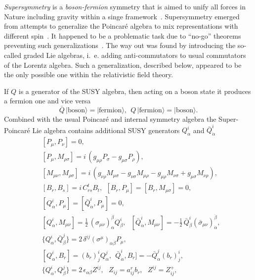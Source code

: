 \documentclass{cernyrep}
\begin{document}
 {\it Supersymmetry} is a {\it boson-fermion} symmetry that is
aimed to unify all forces in Nature including gravity within a
singe framework~\cite{super,Rev,WessB,sspace,Books}.
Supersymmetry emerged from attempts to generalize the Poincar\'e
algebra to mix representations with different spin~\cite{super}.
It happened to be a problematic task due to ``no-go'' theorems
preventing such generalizations~\cite{theorem}. The way out was
found by introducing the so-called graded Lie algebras, i.~e. adding
anti-commutators to usual commutators of the Lorentz algebra.
Such a generalization, described below, appeared to be the only
possible one within the relativistic field theory.

If $Q$ is a generator of the SUSY algebra, then acting on a
boson state it produces a fermion one and vice versa
$$
\bar Q \, | \text{boson} \rangle = | \text{fermion} \rangle , \ \
Q \, | \text{fermion} \rangle = | \text{boson} \rangle.
$$
Combined with the usual Poincar\'e and internal symmetry
algebra the Super-Poincar\'e Lie algebra contains additional
SUSY generators
$Q_{\alpha}^i$ and $\bar Q_{\dot\alpha}^i$~\cite{WessB}
\begin{equation}
\begin{split}
&[P_\mu, P_\nu] = 0, \\
&[P_\mu, M_{\rho\sigma}] = i \,(g_{\mu\rho} P_\sigma - g_{\mu\sigma} P_\rho), \\
&[M_{\mu\nu}, M_{\rho\sigma}] =
    i \,(g_{\nu\rho} M_{\mu\sigma} - g_{\nu\sigma} M_{\mu\rho}
    - g_{\mu\rho} M_{\nu \sigma} + g_{\mu\sigma} M_{\nu\rho}), \\
     &[B_r, B_s] = i \, C_{rs}^t B_{t}, \ \ 
[B_r , P_{\mu}] = [B_r, M_{\mu\sigma}] = 0, \\
&[Q_{\alpha}^i , P_{\mu}] = [\bar Q_{\dot\alpha}^i, P_{\mu}] = 0, \\
&[Q_{\alpha}^i , M_{\mu\nu}] = \frac12 \, (\sigma_{\mu\nu})_{\alpha}^{\beta}Q_{\beta}^i, \ \ \
 [\bar Q_{\dot\alpha}^i, M_{\mu\nu}] = -\frac12 \, \bar Q_{\dot\beta}^i
   (\bar\sigma_{\mu\nu})_{\dot\alpha}^{\dot \beta}, \\
   &\{ Q_{\alpha}^i, \bar Q_{\dot\beta}^j \} = 2 \, \delta^{ij} (\sigma^\mu)_{\alpha \dot\beta} P_\mu, \\
    &[Q_{\alpha}^i, B_r] = (b_r)_j^i Q_{\alpha}^j, \ \  \bar Q_{\dot\alpha}^i, B_r] = - \bar Q_{\dot\alpha}^j (b_r)_j^i, \\   
    &\{ Q_{\alpha}^i, Q_{\beta}^j \} = 2 \, \epsilon_{\alpha \beta}Z^{ij}, \ \ \
    Z_{ij} = a_{ij}^r b_r, \ \ \ Z^{ij} = Z_{ij}^+, \\
 \end{split}
\label{group}
\end{equation}
\end{document}
